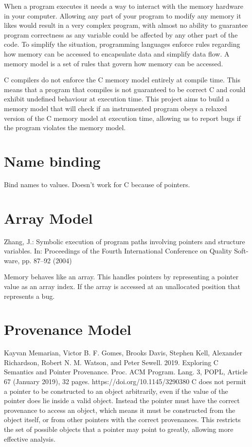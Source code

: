 \documentclass[12pt,twoside]{report}
\begin{document}
When a program executes it needs a way to interact with the memory hardware in your computer. Allowing any part of your program to modify any memory it likes would result in a very complex program, with almost no ability to guarantee program correctness as any variable could be affected by any other part of the code. To simplify the situation, programming languages enforce rules regarding how memory can be accessed to encapsulate data and simplify data flow. A memory model is a set of rules that govern how memory can be accessed.

C compilers do not enforce the C memory model entirely at compile time. This means that a program that compiles is not guaranteed to be correct C and could exhibit undefined behaviour at execution time. This project aims to build a memory model that will check if an instrumented program obeys a relaxed version of the C memory model at execution time, allowing us to report bugs if the program violates the memory model.

\section{Name binding}
Bind names to values. Doesn't work for C because of pointers.

\section{Array Model}
 Zhang, J.: Symbolic execution of program paths involving pointers and structure
variables. In: Proceedings of the Fourth International Conference on Quality Soft-
ware, pp. 87–92 (2004)

Memory behaves like an array. This handles pointers by representing a pointer value as an array index. If the array is accessed at an unallocated position that represents a bug.

\section{Provenance Model}
Kayvan Memarian, Victor B. F. Gomes, Brooks Davis, Stephen Kell, Alexander Richardson, Robert N. M.
Watson, and Peter Sewell. 2019. Exploring C Semantics and Pointer Provenance. Proc. ACM Program. Lang. 3,
POPL, Article 67 (January 2019), 32 pages. https://doi.org/10.1145/3290380
C does not permit a pointer to be constructed to an object arbitrarily, even if the value of the pointer does lie inside a valid object. Instead the pointer must have the correct provenance to access an object, which means it must be constructed from the object itself, or from other pointers with the correct provenances. This restricts the set of possible objects that a pointer may point to greatly, allowing more effective analysis.
\end{document}
